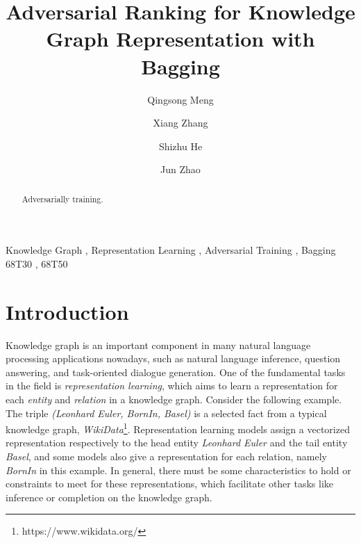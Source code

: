 \documentclass[twocolumn,a4paper,10pt,review,5p]{elsarticle}
\begin{document}

\begin{frontmatter}

\title{Adversarial Ranking for Knowledge Graph Representation with Bagging}


\author[hrbaddress]{Qingsong Meng}

\author[ucasaddress,hrbaddress]{Xiang Zhang}

\author[ucasaddress]{Shizhu He}

\author[ucasaddress]{Jun Zhao}

\address[hrbaddress]{Harbin University of Science and Technology, No.52 Xuefu Road, Nangang District, Harbin, 150080, China}
\address[ucasaddress]{University of Chinese Academy of Sciences, No.19(A) Yuquan Road, Shijingshan District, Beijing, P.R.China 100049}


\begin{abstract}
Adversarially training.
\end{abstract}

\begin{keyword}
Knowledge Graph \sep{} Representation Learning \sep{} Adversarial Training \sep{} Bagging
\MSC[2010] 68T30 \sep{} 68T50
\end{keyword}

\end{frontmatter}


\linenumbers{}


\section{Introduction}
\label{sec:intro}

Knowledge graph is an important component in many natural language processing applications nowadays, such as natural language inference, question answering, and task-oriented dialogue generation. One of the fundamental tasks in the field is \emph{representation learning}, which aims to learn a representation for each \emph{entity} and \emph{relation} in a knowledge graph. Consider the following example. The triple \emph{(Leonhard Euler, BornIn, Basel)} is a selected fact from a typical knowledge graph, \emph{WikiData}\footnote{https://www.wikidata.org/}. Representation learning models assign a vectorized representation respectively to the head entity \emph{Leonhard Euler} and the tail entity \emph{Basel}, and some models also give a representation for each relation, namely \emph{BornIn} in this example. In general, there must be some characteristics to hold or constraints to meet for these representations, which facilitate other tasks like inference or completion on the knowledge graph.
\end{document}
